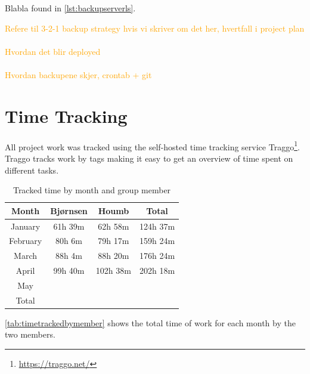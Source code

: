 Blabla found in \autoref{lst:backupserverls}.

\begin{figure}[h]

\end{figure}

\textcolor{orange}{
Refere til 3-2-1 backup strategy hvis vi skriver om det her, hvertfall i project plan \\ \\
Hvordan det blir deployed \\ \\
Hvordan backupene skjer, crontab + git
}

\section{Time Tracking}

All project work was tracked using the self-hosted time tracking service Traggo\footnote{\url{https://traggo.net/}}. Traggo tracks work by tags making it easy to get an overview of time spent on different tasks.

\begin{table}[h]
    \centering
    \begin{tabular}{c|c|c|c}
        \hline
        \textbf{Month} & \textbf{Bjørnsen} & \textbf{Houmb} & \textbf{Total} \\
        \hline
        January  & 61h 39m  & 62h 58m  & 124h 37m \\
        February & 80h 6m   & 79h 17m  & 159h 24m \\
        March    & 88h 4m   & 88h 20m  & 176h 24m \\
        April    & 99h 40m  & 102h 38m  & 202h 18m \\
        May      &        &        &        \\
        \hline
        Total & & & \\
        \hline
    \end{tabular}
    \caption{Tracked time by month and group member}
    \label{tab:timetrackedbymember}
\end{table}

\autoref{tab:timetrackedbymember} shows the total time of work for each month by the two members.

